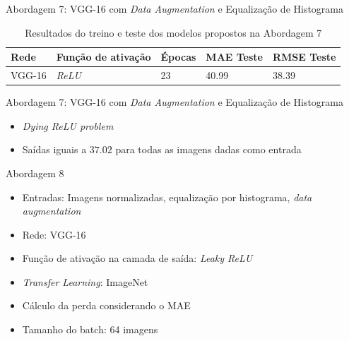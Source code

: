 \begin{frame}{\large{Abordagem 7: VGG-16 com \emph{Data Augmentation} e Equalização de Histograma}}
  \begin{table}[!ht]
  	\centering
  	\caption{Resultados do treino e teste dos modelos propostos na Abordagem 7}
  	\label{tab:results-7}
  		\begin{tabular}{l l l l l }
  			\toprule
  			Rede & Função de ativação & Épocas & MAE Teste & RMSE Teste \\
  			\midrule
  			VGG-16 & \emph{ReLU} & 23 & 40.99 & 38.39 \\
  			\bottomrule
  		\end{tabular}
  	\end{table}
\end{frame}

\begin{frame}{\large{Abordagem 7: VGG-16 com \emph{Data Augmentation} e Equalização de Histograma}}
  \begin{itemize}
    \item \emph{Dying ReLU problem}
    \item Saídas iguais a $37.02$ para todas as imagens dadas como entrada
  \end{itemize}
\end{frame}



\begin{frame}{\large{Abordagem 8}}
 \begin{itemize}
   \item Entradas: Imagens normalizadas, equalização por histograma, \emph{data augmentation}
   \item Rede: VGG-16
   \item Função de ativação na camada de saída: \alert{\emph{Leaky ReLU}}
   \item \alert{\emph{Transfer Learning}: ImageNet}
   \ \ \newline
   \item Cálculo da perda considerando o MAE
   \item Tamanho do batch: 64 imagens
   \end{itemize}
\end{frame}

